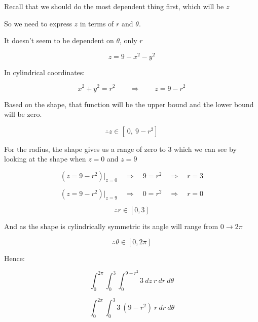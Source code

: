 \documentclass{article}
\begin{document}
Recall that we should do the most dependent thing first, which will be $z$

So we need to express $z$ in terms of $r$ and $\theta$. 

It doesn't seem to be dependent on $\theta$, only $r$ 

\begin{equation}
  z = 9 -x^2 -y^2
\end{equation}

In cylindrical coordinates:

\begin{equation}
  x^2 + y^2 = r^2 \qquad \Rightarrow \qquad z = 9 - r^2
\end{equation}

Based on the shape, that function will be the upper bound and the lower 
bound will be zero. 

\begin{equation}
  \therefore z \in [ \ 0, \ 9-r^2] 
\end{equation}

For the radius, the shape gives us a range of zero to 3 which we can see by 
looking at the shape when $z=0$ and $z=9$

\begin{equation}
  \left( z = 9 - r^2 \right) \bigg|_{z  = 0} \quad \Rightarrow \quad 9 = r^2 
  \quad \Rightarrow \quad r = 3
\end{equation}

\begin{equation}
  \left( z = 9 - r^2 \right) \bigg|_{z  = 9} \quad \Rightarrow \quad 0 = r^2 
  \quad \Rightarrow \quad r = 0
\end{equation}

\begin{equation}
  \therefore r \in [ 0, 3 ]
\end{equation}

And as the shape is cylindrically symmetric its angle will range from $0 
\rightarrow 2\pi$

\begin{equation}
  \therefore \theta \in [0, 2\pi]
\end{equation}

Hence: 

\begin{equation}
  \int^{2 \pi}_{0}\int^{3}_{0}\int^{9-r^2}_{0} 3 \ dz \ r \ dr \ d \theta
\end{equation}

\begin{equation}
  \int^{2 \pi}_{0}\int^{3}_{0} 3 \  (9-r^2) \ r \ dr \ d \theta
\end{equation}
\end{document}
